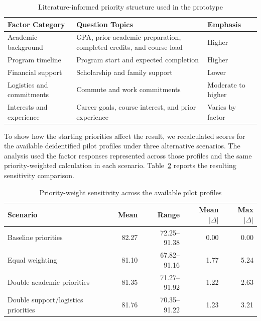 \documentclass[letterpaper,11pt]{article}
\begin{document}
\begin{table}[htbp]
\caption{Literature-informed priority structure used in the prototype}
\label{tab:priority}
\centering
\begin{tabular}{@{}p{3.4cm}p{8.0cm}p{2.4cm}@{}}
\toprule
\textbf{Factor Category} & \textbf{Question Topics} & \textbf{Emphasis} \\
\midrule
Academic background & GPA, prior academic preparation, completed credits, and course load & Higher \\
\addlinespace[2pt]
Program timeline & Program start and expected completion & Higher \\
\addlinespace[2pt]
Financial support & Scholarship and family support & Lower \\
\addlinespace[2pt]
Logistics and commitments & Commute and work commitments & Moderate to higher \\
\addlinespace[2pt]
Interests and experience & Career goals, course interest, and prior experience & Varies by factor \\
\bottomrule
\end{tabular}
\end{table}

To show how the starting priorities affect the result, we recalculated scores for the available deidentified pilot profiles under three alternative scenarios. The analysis used the factor responses represented across those profiles and the same priority-weighted calculation in each scenario.
Table~\ref{tab:sensitivity} reports the resulting sensitivity comparison.

\begin{table}[htbp]
\caption{Priority-weight sensitivity across the available pilot profiles}
\label{tab:sensitivity}
\centering
\begin{tabular}{@{}p{4.1cm}rrrr@{}}
\toprule
\textbf{Scenario} & \textbf{Mean} & \textbf{Range} & \textbf{Mean $|\Delta|$} & \textbf{Max $|\Delta|$} \\
\midrule
Baseline priorities & 82.27 & 72.25--91.38 & 0.00 & 0.00 \\
Equal weighting & 81.10 & 67.82--91.16 & 1.77 & 5.24 \\
Double academic priorities & 81.35 & 71.27--91.92 & 1.22 & 2.63 \\
Double support/logistics priorities & 81.76 & 70.35--91.22 & 1.23 & 3.21 \\
\bottomrule
\end{tabular}
\end{table}
\end{document}
